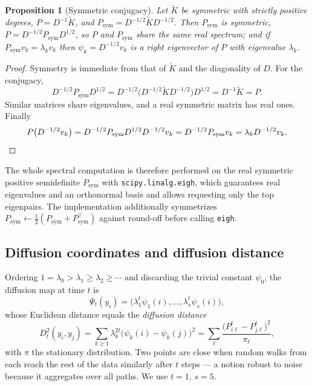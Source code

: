 \documentclass[11pt]{article}
\newtheorem{proposition}{Proposition}
\newcommand{\Kt}{\widetilde{K}}
\begin{document}
\begin{proposition}[Symmetric conjugacy]
\label{prop:conjugacy}
Let $\Kt$ be symmetric with strictly positive degrees, $P = D^{-1}\Kt$, and
$P_{\mathrm{sym}} = D^{-1/2}\Kt D^{-1/2}$. Then $P_{\mathrm{sym}}$ is symmetric,
$P = D^{-1/2}P_{\mathrm{sym}}D^{1/2}$, so $P$ and $P_{\mathrm{sym}}$ share the
same real spectrum; and if $P_{\mathrm{sym}}v_k = \lambda_k v_k$ then
$\psi_k = D^{-1/2}v_k$ is a right eigenvector of $P$ with eigenvalue $\lambda_k$.
\end{proposition}

\begin{proof}
Symmetry is immediate from that of $\Kt$ and the diagonality of $D$. For the
conjugacy,
\[
D^{-1/2}P_{\mathrm{sym}}D^{1/2}
= D^{-1/2}\bigl(D^{-1/2}\Kt D^{-1/2}\bigr)D^{1/2}
= D^{-1}\Kt = P .
\]
Similar matrices share eigenvalues, and a real symmetric matrix has real ones.
Finally
\[
P\bigl(D^{-1/2}v_k\bigr)
= D^{-1/2}P_{\mathrm{sym}}D^{1/2}D^{-1/2}v_k
= D^{-1/2}P_{\mathrm{sym}}v_k
= \lambda_k D^{-1/2}v_k . \qedhere
\]
\end{proof}

The whole spectral computation is therefore performed on the real symmetric
positive semidefinite $P_{\mathrm{sym}}$ with \texttt{scipy.linalg.eigh}, which
guarantees real eigenvalues and an orthonormal basis and allows requesting only
the top eigenpairs. The implementation additionally symmetrizes
$P_{\mathrm{sym}}\leftarrow\tfrac12(P_{\mathrm{sym}}+P_{\mathrm{sym}}^\top)$
against round-off before calling \texttt{eigh}.

\subsection{Diffusion coordinates and diffusion distance}

Ordering $1 = \lambda_0 > \lambda_1 \ge \lambda_2 \ge \cdots$ and discarding the
trivial constant $\psi_0$, the diffusion map at time $t$ is
\begin{equation}
\Psi_t(y_i) = \bigl(\lambda_1^t\psi_1(i),\dots,\lambda_s^t\psi_s(i)\bigr) ,
\label{eq:embedding}
\end{equation}
whose Euclidean distance equals the \emph{diffusion distance}
\begin{equation}
D_t^2(y_i,y_j) = \sum_{k\ge1}\lambda_k^{2t}\bigl(\psi_k(i)-\psi_k(j)\bigr)^2
= \sum_\ell \frac{\bigl(P^t_{i\ell}-P^t_{j\ell}\bigr)^2}{\pi_\ell} ,
\label{eq:diffdist}
\end{equation}
with $\pi$ the stationary distribution. Two points are close when random walks
from each reach the rest of the data similarly after $t$ steps --- a notion
robust to noise because it aggregates over all paths. We use $t=1$, $s=5$.
\end{document}
